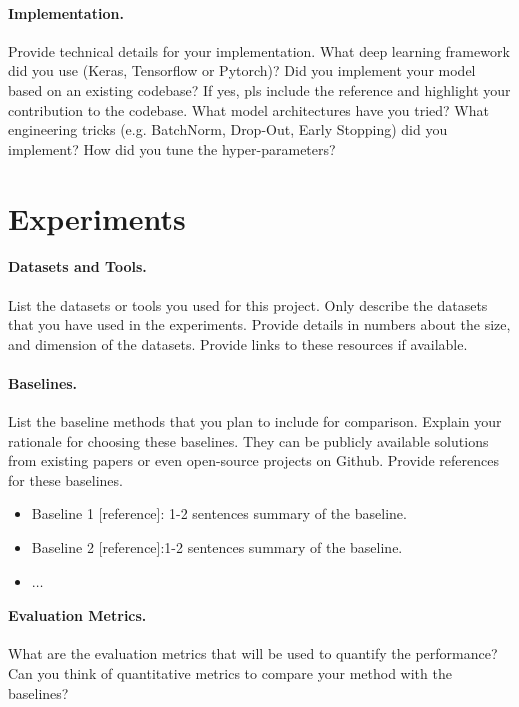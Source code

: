 \documentclass{article}
\begin{document}
\paragraph{Implementation.}
Provide technical details for your implementation. What deep
learning framework did you use (Keras, Tensorflow or Pytorch)? Did
you implement your model based on an existing codebase? If yes, pls
include the reference and highlight your contribution to the
codebase. What model architectures have you tried? What engineering
tricks (e.g. BatchNorm, Drop-Out, Early Stopping) did you implement?
How did you tune the hyper-parameters?

\section{Experiments}
\paragraph{Datasets and Tools.}
List the datasets or tools  you used for this project. Only describe
the datasets that you have used in the experiments. Provide details
in numbers about the size, and dimension of the datasets. Provide
links to these resources if available.

\paragraph{Baselines.}
List the  baseline methods  that you plan to include for comparison.
Explain your rationale for choosing these baselines. They can be
publicly available solutions from existing papers or even
open-source projects on Github. Provide references for these baselines.
{

  \begin{itemize}
    \item Baseline 1 [reference]: 1-2 sentences summary of the baseline.
    \item Baseline 2 [reference]:1-2 sentences summary of the baseline.
    \item $\dots$
  \end{itemize}
}

\paragraph{Evaluation Metrics.}
What are the evaluation metrics that will be used to quantify the
performance? Can you think of quantitative metrics to compare your
method with the baselines?
\end{document}
